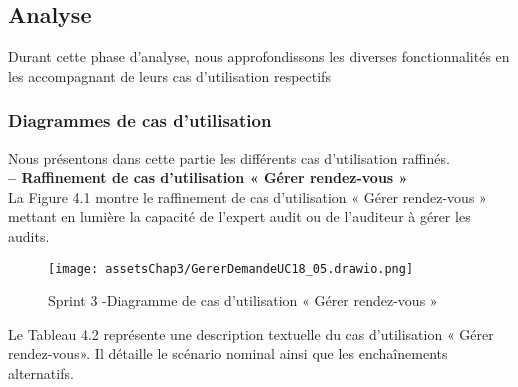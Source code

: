 \subsection{Analyse}
Durant cette phase d'analyse, nous approfondissons les diverses fonctionnalités en les accompagnant de leurs cas d'utilisation respectifs
\subsubsection{Diagrammes de cas d'utilisation}
Nous présentons dans cette partie les différents cas d'utilisation raffinés.
\\

\textbf{– Raffinement de cas d'utilisation « Gérer rendez-vous  »
}\\
La Figure 4.1 montre le raffinement de cas d'utilisation « Gérer rendez-vous  » mettant en lumière la capacité de l'expert audit ou de l'auditeur à gérer les audits.
\begin{figure}[H]
\centering
\texttt{[image: assetsChap3/GererDemandeUC18\_05.drawio.png]}
\caption{ Sprint 3 -Diagramme de cas d'utilisation « Gérer rendez-vous » }
\end{figure}

Le Tableau 4.2 représente une description textuelle du cas d'utilisation « Gérer rendez-vous». Il
détaille le scénario nominal ainsi que les enchaînements alternatifs.


